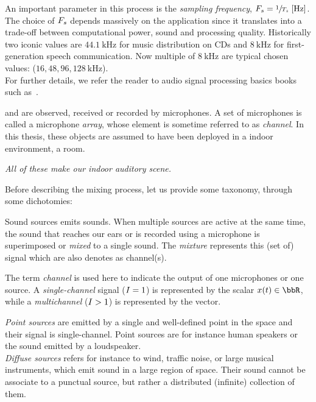 An important parameter in this process is the \textit{sampling frequency},  $\Fs = \sfrac{1}{\Ts}\;[\si{\Hz}]$.
The choice of $F_s$ depends massively on the application since it translates into a trade-off between computational power, sound and processing quality.
Historically two iconic values are $\SI{44.1}{\kHz}$ for music distribution on CDs and $\SI{8}{\kHz}$ for first-generation speech communication.
Now multiple of $\SI{8}{\kHz}$ are typical chosen values: ($16, 48, 96, \SI{128}{\kHz}$).
\\For further details, we refer the reader to audio signal processing basics books such as~\cite{rocchesso2003introduction}.

 and are observed, received or recorded by microphones.
A set of microphones is called a microphone \textit{array}, whose element is sometime referred to as \textit{channel}.
In this thesis, these objects are assumed to have been deployed in a indoor environment, a room.
\begin{center}
    \textit{All of these make our indoor \emph{auditory scene}.}
\end{center}
Before describing the mixing process, let us provide some taxonomy, through some dichotomies:

Sound sources emits sounds.
When multiple sources are active at the same time, the sound that reaches our ears or is recorded using a microphone is superimposed or \textit{mixed} to a single sound.
The \textit{mixture} represents this (set of) signal which are also denotes as channel(s).

The term \textit{channel}
 is used here to indicate the output of one microphones or one source.
A \textit{single-channel} signal ($I = 1$) is represented by the scalar $\mic(t) \in \R$,
while a \textit{multichannel} ($I >   1$) is represented by the vector.

\textit{Point sources} are emitted by a single and well-defined point in the space and their signal is single-channel.
Point sources are for instance human speakers or the sound emitted by a loudspeaker.
\\\textit{Diffuse sources} refers for instance to wind, traffic noise, or large musical instruments, which emit sound in a large region of space.
Their sound cannot be associate to a punctual source, but rather a distributed (infinite) collection of them.

